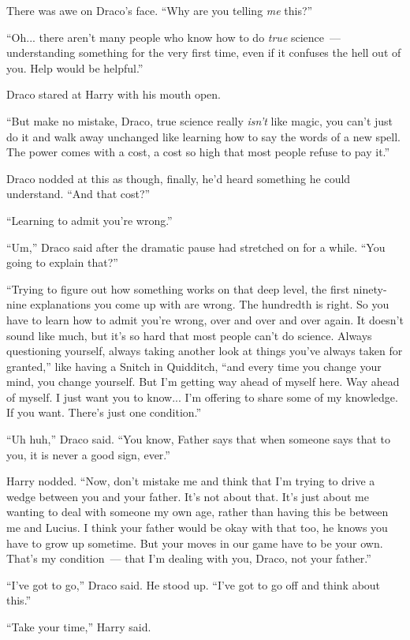 There was awe on Draco's face. ``Why are you telling \emph{me} this?''

``Oh... there aren't many people who know how to do \emph{true} science~--- understanding something for the very first time, even if it confuses the hell out of you. Help would be helpful.''

Draco stared at Harry with his mouth open.

``But make no mistake, Draco, true science really \emph{isn't} like magic, you can't just do it and walk away unchanged like learning how to say the words of a new spell. The power comes with a cost, a cost so high that most people refuse to pay it.''

Draco nodded at this as though, finally, he'd heard something he could understand. ``And that cost?''

``Learning to admit you're wrong.''

``Um,'' Draco said after the dramatic pause had stretched on for a while. ``You going to explain that?''

``Trying to figure out how something works on that deep level, the first ninety-nine explanations you come up with are wrong. The hundredth is right. So you have to learn how to admit you're wrong, over and over and over again. It doesn't sound like much, but it's so hard that most people can't do science. Always questioning yourself, always taking another look at things you've always taken for granted,'' like having a Snitch in Quidditch, ``and every time you change your mind, you change yourself. But I'm getting way ahead of myself here. Way ahead of myself. I just want you to know... I'm offering to share some of my knowledge. If you want. There's just one condition.''

``Uh huh,'' Draco said. ``You know, Father says that when someone says that to you, it is never a good sign, ever.''

Harry nodded. ``Now, don't mistake me and think that I'm trying to drive a wedge between you and your father. It's not about that. It's just about me wanting to deal with someone my own age, rather than having this be between me and Lucius. I think your father would be okay with that too, he knows you have to grow up sometime. But your moves in our game have to be your own. That's my condition~--- that I'm dealing with you, Draco, not your father.''

``I've got to go,'' Draco said. He stood up. ``I've got to go off and think about this.''

``Take your time,'' Harry said.

